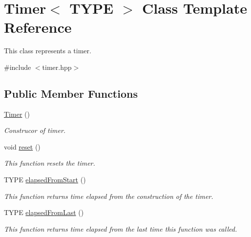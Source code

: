 \hypertarget{classTimer}{}\section{Timer$<$ T\+Y\+PE $>$ Class Template Reference}
\label{classTimer}


This class represents a timer.  




{\ttfamily \#include $<$timer.\+hpp$>$}

\subsection*{Public Member Functions}
\begin{DoxyCompactItemize}
\item 
\mbox{\label{classTimer_ac2eb752a6b9637733fb7eb45a57d009a}} 
\hyperlink{classTimer_ac2eb752a6b9637733fb7eb45a57d009a}{Timer} ()
\begin{DoxyCompactList}\small\item\em Construcor of timer. \end{DoxyCompactList}\item 
\mbox{\label{classTimer_adff965ac1f6c3b04fd5e62c177662f3f}} 
void \hyperlink{classTimer_adff965ac1f6c3b04fd5e62c177662f3f}{reset} ()
\begin{DoxyCompactList}\small\item\em This function resets the timer. \end{DoxyCompactList}\item 
T\+Y\+PE \hyperlink{classTimer_ac04d0efef266558d59d647c769d2738d}{elapsed\+From\+Start} ()
\begin{DoxyCompactList}\small\item\em This function returns time elapsed from the construction of the timer. \end{DoxyCompactList}\item 
T\+Y\+PE \hyperlink{classTimer_a83d6f139a67a082e00c7ed74fcd4d83d}{elapsed\+From\+Last} ()
\begin{DoxyCompactList}\small\item\em This function returns time elapsed from the last time this function was called. \end{DoxyCompactList}\end{DoxyCompactItemize}
